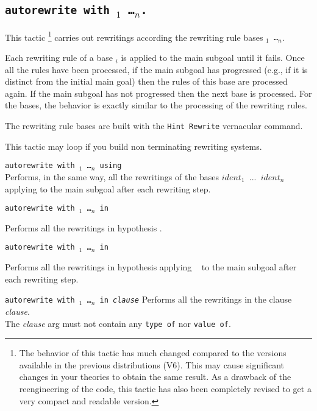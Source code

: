 \subsection{\tt autorewrite with \ident$_1$ \dots \ident$_n$.
\label{tactic:autorewrite}
}

This tactic \footnote{The behavior of this tactic has much changed compared to
the versions available in the previous distributions (V6). This may cause
significant changes in your theories to obtain the same result. As a drawback
of the reengineering of the code, this tactic has also been completely revised
to get a very compact and readable version.} carries out rewritings according
the rewriting rule bases {\tt \ident$_1$ \dots \ident$_n$}.

Each rewriting rule of a base \ident$_i$ is applied to the main subgoal until
it fails. Once all the rules have been processed, if the main subgoal has
progressed (e.g., if it is distinct from the initial main goal) then the rules
of this base are processed again. If the main subgoal has not progressed then
the next base is processed. For the bases, the behavior is exactly similar to
the processing of the rewriting rules.

The rewriting rule bases are built with the {\tt Hint~Rewrite} vernacular
command.

\Warning{} This tactic may loop if you build non terminating rewriting systems.

\begin{Variant}
\item {\tt autorewrite with \ident$_1$ \dots \ident$_n$ using \tac}\\
Performs, in the same way, all the rewritings of the bases {\tt $ident_1$ $...$
$ident_n$} applying {\tt \tac} to the main subgoal after each rewriting step.

\item \texttt{autorewrite with {\ident$_1$} \dots \ident$_n$ in {\qualid}}

  Performs all the rewritings in hypothesis {\qualid}.
\item \texttt{autorewrite with {\ident$_1$} \dots \ident$_n$ in {\qualid}}

  Performs all  the rewritings  in hypothesis {\qualid}  applying {\tt
    \tac} to the main subgoal after each rewriting step.

\item \texttt{autorewrite with {\ident$_1$} \dots \ident$_n$ in \textit{clause}}
  Performs all  the rewritings  in the clause \textit{clause}. \\
  The  \textit{clause} arg must  not contain  any \texttt{type  of} nor  \texttt{value  of}.

\end{Variant}


